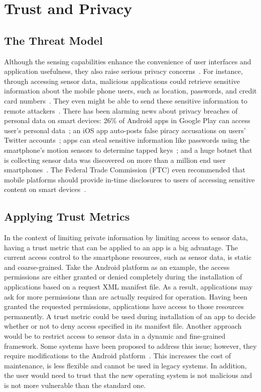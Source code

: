 \section{Trust and Privacy}
\label{sec:blursense}

\subsection{The Threat Model}
Although the sensing capabilities enhance the convenience of user interfaces and
application usefulness, they also raise serious privacy
concerns~\cite{shabtai2010google}. For instance, through accessing sensor data,
malicious applications could retrieve sensitive information about the mobile
phone users, such as location, passwords, and credit card numbers~\cite{xu2012taplogger, 
miluzzo2012tapprints, xu2009stealthy, cai2011touchlogger}. They
even might be able to send these sensitive information to remote
attackers~\cite{schlegel2011soundcomber, marquardt2011sp}. There
has been alarming news about privacy breaches of personal data on smart devices:
26\% of Android apps in Google Play can access user's personal
data~\cite{toomuch}; an iOS app auto-posts false piracy accusations on users'
Twitter accounts~\cite{tweetios}; apps can steal sensitive information like
passwords using the smartphone's motion sensors to determine tapped
keys~\cite{xu2012taplogger}; and a huge botnet that is collecting sensor data
was discovered on more than a million end user smartphones~\cite{botnet}. The
Federal Trade Commission (FTC) even recommended that mobile platforms should
provide in-time disclosures to users of accessing sensitive content on smart
devices~\cite{ftc}. 

\subsection{Applying Trust Metrics}
In the context of limiting  private information by limiting access to sensor data,
having a trust metric that can be applied to an app is a big advantage.
The current access control to the smartphone resources,
such as sensor data, is static and coarse-grained. 
Take the
Android platform as an example, the access permissions are
either granted or denied completely during the installation of
applications based on a request XML manifest file. As a result,
applications may ask for more permissions than are actually
required for operation. Having been granted the requested
permissions, applications have access to those resources permanently. 
A trust metric could be used during installation of an app to decide whether or not
to deny access specified in its manifest file.  
Another approach would be to restrict access to sensor data in a
dynamic and fine-grained framework.
Some systems have been proposed to address this
issue; however, they require modifications to the Android
platform~\cite{conti2011crepe, hornyack2011these}. This increases the cost of maintenance, is
less flexible and cannot be used in legacy systems. In addition,
the user would need to trust that the new operating system is
not malicious and is not more vulnerable than the standard one.

